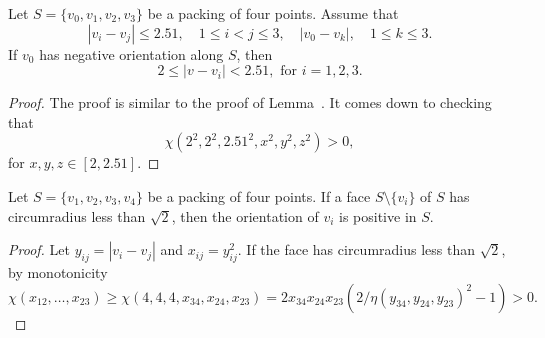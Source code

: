 \begin{tarskidata}
\begin{tarski}

\begin{lemma} Let $S=\{v_0,v_1,v_2,v_3\}$ be a
packing of four points.  Assume that 
  $$
  |v_i-v_j|\le 2.51,\quad 1\le i < j \le 3,
  \quad |v_0-v_k|,\quad 1\le k\le 3.
  $$
 If $v_0$
has negative orientation along
$S$, then
  $$
  2 \le |v-v_i | < 2.51, \text{ for } i=1,2,3.
  $$
\end{lemma}

\begin{proof} The proof is similar to the proof of
Lemma~. It comes down to checking that
    $$
    \chi(2^2,2^2,2.51^2,x^2,y^2,z^2)>0,$$
    for $x,y,z\in[2,2.51]$.
\end{proof}
\end{tarski}




\begin{tarski}

\begin{lemma}
%
Let $S=\{v_1,v_2,v_3,v_4\}$ be a packing of four
points.
If a face $S\setminus\{v_i\}$ of $S$ 
has circumradius less than $\sqrt2$, then
the orientation of $v_i$ is positive in $S$.
\end{lemma}

\begin{proof}
Let $y_{ij}=|v_i-v_j|$ and $x_{ij} = y_{ij}^2$.
If the face has circumradius less than $\sqrt2$, by monotonicity
    $$\chi(x_{12},\ldots,x_{23}) \ge \chi(4,4,4,x_{34},x_{24},x_{23})
    = 2 x_{34}x_{24}x_{23}
    (2/\eta(y_{34},y_{24},y_{23})^2 - 1) >0.$$
\end{proof}
\end{tarski}





\begin{tarski}


\end{tarski}
\end{tarskidata}
